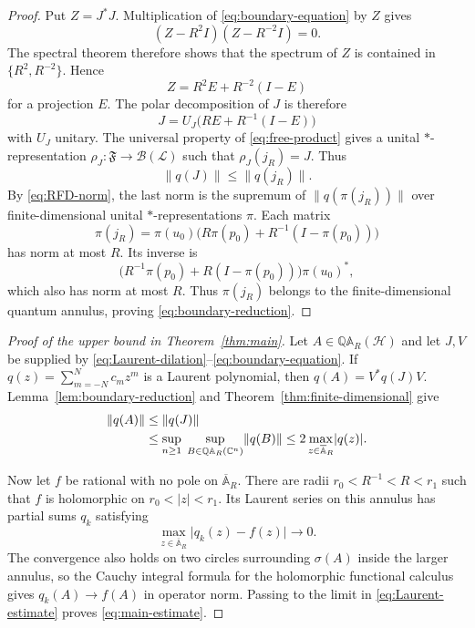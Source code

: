 \documentclass[preprints,article,submit,oneauthor]{Definitions/mdpi}
\theoremstyle{mdpi}
\theoremstyle{definition}
\newcommand{\C}{\mathbb C}
\begin{document}
\begin{proof}
Put $Z=J^*J$.  Multiplication of \eqref{eq:boundary-equation} by $Z$
gives
\[
  (Z-R^2I)(Z-R^{-2}I)=0.
\]
The spectral theorem therefore shows that the spectrum of $Z$ is
contained in $\{R^2,R^{-2}\}$.  Hence
\begin{equation}
  Z=R^2E+R^{-2}(I-E)
  \label{eq:two-point-modulus}
\end{equation}
for a projection $E$.  The polar decomposition of $J$ is therefore
\begin{equation}
  J=U_J\bigl(RE+R^{-1}(I-E)\bigr)
  \label{eq:boundary-polar-form}
\end{equation}
with $U_J$ unitary.  The universal property of \eqref{eq:free-product}
gives a unital $*$-representation
$\rho_J\colon\mathfrak F\to\mathcal B(\mathcal L)$ such that
$\rho_J(j_R)=J$.  Thus
\[
  \lVert q(J)\rVert\leq\lVert q(j_R)\rVert.
\]
By \eqref{eq:RFD-norm}, the last norm is the supremum of
$\lVert q(\pi(j_R))\rVert$ over finite-dimensional unital
$*$-representations $\pi$.  Each matrix
\[
  \pi(j_R)=\pi(u_0)
  \bigl(R\pi(p_0)+R^{-1}(I-\pi(p_0))\bigr)
\]
has norm at most $R$.  Its inverse is
\[
  \bigl(R^{-1}\pi(p_0)+R(I-\pi(p_0))\bigr)\pi(u_0)^*,
\]
which also has norm at most $R$.  Thus $\pi(j_R)$ belongs to the
finite-dimensional quantum annulus, proving
\eqref{eq:boundary-reduction}.
\end{proof}

\begin{proof}[Proof of the upper bound in Theorem~\ref{thm:main}]
Let $A\in\mathbb Q\mathbb A_R(\mathcal H)$ and let $J,V$ be supplied
by \eqref{eq:Laurent-dilation}--\eqref{eq:boundary-equation}.  If
$q(z)=\sum_{m=-N}^N c_mz^m$ is a Laurent polynomial, then
$q(A)=V^*q(J)V$.  Lemma~\ref{lem:boundary-reduction} and
Theorem~\ref{thm:finite-dimensional} give
\begin{align}
  \lVert q(A)\rVert
  &\leq\lVert q(J)\rVert \notag\\
  &\leq
  \sup_{n\geq1}\;
  \sup_{B\in\mathbb Q\mathbb A_R(\C^n)}\lVert q(B)\rVert
  \leq2\max_{z\in\overline{\mathbb A}_R}\lvert q(z)\rvert.
  \label{eq:Laurent-estimate}
\end{align}

Now let $f$ be rational with no pole on
$\overline{\mathbb A}_R$.  There are radii
$r_0<R^{-1}<R<r_1$ such that $f$ is holomorphic on
$r_0<\lvert z\rvert<r_1$.  Its Laurent series on this annulus has
partial sums $q_k$ satisfying
\begin{equation}
  \max_{z\in\overline{\mathbb A}_R}
  \lvert q_k(z)-f(z)\rvert\longrightarrow0.
  \label{eq:Laurent-uniform}
\end{equation}
The convergence also holds on two circles surrounding
$\sigma(A)$ inside the larger annulus, so the Cauchy integral formula
for the holomorphic functional calculus gives
$q_k(A)\to f(A)$ in operator norm.  Passing to the limit in
\eqref{eq:Laurent-estimate} proves \eqref{eq:main-estimate}.
\end{proof}
\end{document}
